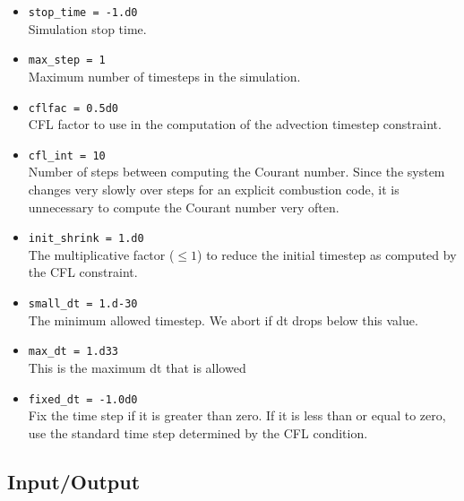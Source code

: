 \documentclass[11pt,letterpaper]{article}
\begin{document}
\begin{itemize}
\item {\tt stop\_time = -1.d0}\\
  Simulation stop time.
\item {\tt max\_step = 1}\\
  Maximum number of timesteps in the simulation.
\item {\tt cflfac = 0.5d0}\\
  CFL factor to use in the computation of the advection timestep
  constraint.
\item {\tt cfl\_int = 10}\\
  Number of steps between computing the Courant number.  Since the
  system changes very slowly over steps for an explicit combustion
  code, it is unnecessary to compute the Courant number very often.
\item {\tt init\_shrink = 1.d0}\\
  The multiplicative factor ($\le 1$) to reduce the initial timestep
  as computed by the CFL constraint.
\item {\tt small\_dt = 1.d-30}\\
  The minimum allowed timestep.  We abort if dt drops below this
  value.
\item {\tt max\_dt = 1.d33}\\
  This is the maximum dt that is allowed
\item {\tt fixed\_dt = -1.0d0}\\
  Fix the time step if it is greater than zero.  If it is less than or
  equal to zero, use the standard time step determined by the CFL
  condition.
\end{itemize}

\subsection{Input/Output}
\end{document}

